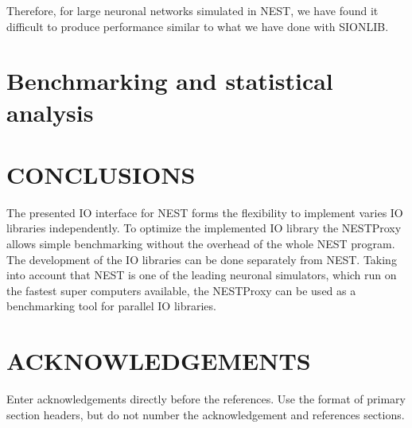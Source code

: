 \documentclass[]{YIC2015}
\begin{document}
Therefore, for large neuronal networks simulated in NEST, we have
found it difficult to produce performance similar to what we have done
with SIONLIB. 

\section{Benchmarking and statistical analysis}


\section{CONCLUSIONS}
The presented IO interface for NEST forms the flexibility to implement varies IO libraries independently.
To optimize the implemented IO library the NESTProxy allows simple benchmarking without the overhead of the whole NEST program.
The development of the IO libraries can be done separately from NEST.
Taking into account that NEST is one of the leading neuronal simulators, which run on the fastest super computers available,
the NESTProxy can be used as a benchmarking tool for parallel IO libraries.

\section*{ACKNOWLEDGEMENTS}
Enter acknowledgements directly before the references. Use the format of primary section headers, but do not number the acknowledgement and references sections.
\end{document}
